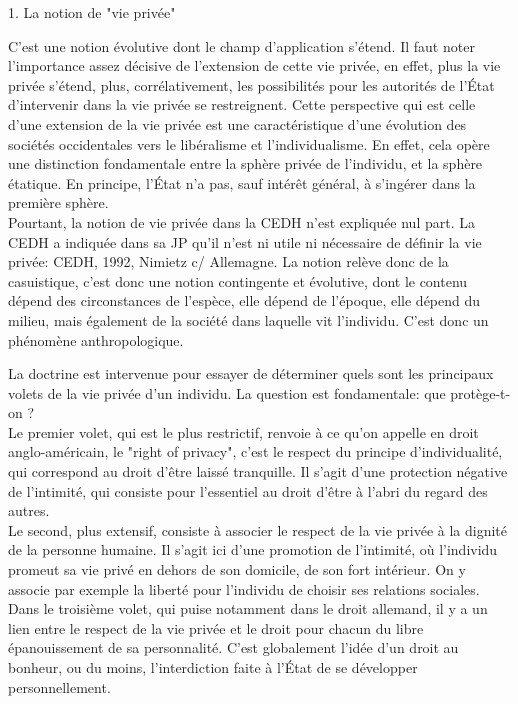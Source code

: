 \documentclass[10pt, a4paper, openany]{book}
\begin{document}
1. La notion de "vie privée"


C'est une notion évolutive dont le champ d'application s'étend. Il faut noter l'importance assez décisive de l'extension de cette vie privée, en effet, plus la vie privée s'étend, plus, corrélativement, les possibilités pour les autorités de l'État d'intervenir dans la vie privée se restreignent. Cette perspective qui est celle d'une extension de la vie privée est une caractéristique d'une évolution des sociétés occidentales vers le libéralisme et l'individualisme. En effet, cela opère une distinction fondamentale entre la sphère privée de l'individu, et la sphère étatique. En principe, l'État n'a pas, sauf intérêt général, à s'ingérer dans la première sphère. \\
Pourtant, la notion de vie privée dans la CEDH n'est expliquée nul part. La CEDH a indiquée dans sa JP qu'il n'est ni utile ni nécessaire de définir la vie privée: CEDH, 1992, Nimietz c/ Allemagne. La notion relève donc de la casuistique, c'est donc une notion contingente et évolutive, dont le contenu dépend des circonstances de l'espèce, elle dépend de l'époque, elle dépend du milieu, mais également de la société dans laquelle vit l'individu. C'est donc un phénomène anthropologique.


La doctrine est intervenue pour essayer de déterminer quels sont les principaux volets de la vie privée d'un individu. La question est fondamentale: que protège-t-on ? \\
Le premier volet, qui est le plus restrictif, renvoie à ce qu'on appelle en droit anglo-américain, le "right of privacy", c'est le respect du principe d'individualité, qui correspond au droit d'être laissé tranquille. Il s'agit d'une protection négative de l'intimité, qui consiste pour l'essentiel au droit d'être à l'abri du regard des autres. \\
Le second, plus extensif, consiste à associer le respect de la vie privée à la dignité de la personne humaine. Il s'agit ici d'une promotion de l'intimité, où l'individu promeut sa vie privé en dehors de son domicile, de son fort intérieur. On y associe par exemple la liberté pour l'individu de choisir ses relations sociales. \\
Dans le troisième volet, qui puise notamment dans le droit allemand, il y a un lien entre le respect de la vie privée et le droit pour chacun du libre épanouissement de sa personnalité. C'est globalement l'idée d'un droit au bonheur, ou du moins, l'interdiction faite à l'État de se développer personnellement. 
\end{document}
